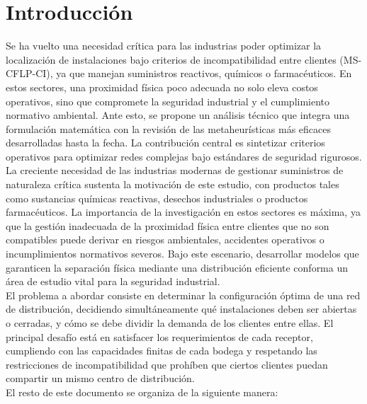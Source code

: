 \documentclass[letter, 10pt]{article}
\begin{document}
\section{Introducción}
Se ha vuelto una necesidad crítica para las industrias poder optimizar la localización de instalaciones bajo criterios de incompatibilidad entre clientes (MS-CFLP-CI), ya que manejan suministros reactivos, químicos o farmacéuticos. En estos sectores, una proximidad física poco adecuada no solo eleva costos operativos, sino que compromete la seguridad industrial y el cumplimiento normativo ambiental. Ante esto, se propone un análisis técnico que integra una formulación matemática con la revisión de las metaheurísticas más eficaces desarrolladas hasta la fecha. La contribución central es sintetizar criterios operativos para optimizar redes complejas bajo estándares de seguridad rigurosos.\\

La creciente necesidad de las industrias modernas de gestionar suministros de naturaleza crítica sustenta la motivación de este estudio, con productos tales como sustancias químicas reactivas, desechos industriales o productos farmacéuticos. La importancia de la investigación en estos sectores es máxima, ya que la gestión inadecuada de la proximidad física entre clientes que no son compatibles puede derivar en riesgos ambientales, accidentes operativos o incumplimientos normativos severos. Bajo este escenario, desarrollar modelos que garanticen la separación física mediante una distribución eficiente conforma un área de estudio vital para la seguridad industrial.\\

El problema a abordar consiste en determinar la configuración óptima de una red de distribución, decidiendo simultáneamente qué instalaciones deben ser abiertas o cerradas, y cómo se debe dividir la demanda de los clientes entre ellas. El principal desafío está en satisfacer los requerimientos de cada receptor, cumpliendo con las capacidades finitas de cada bodega y respetando las restricciones de incompatibilidad que prohíben que ciertos clientes puedan compartir un mismo centro de distribución.\\

El resto de este documento se organiza de la siguiente manera:
\end{document}
